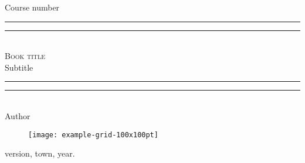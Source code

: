 \documentclass[12pt,oneside]{article}
\begin{document}
	
	\begin{titlepage}
		\hfill {}\par
		\vspace{0.25in}
		
		\begin{center}
			{Course number}\par
			\vspace{0.5in}
			\vspace*{\baselineskip}
			\rule{4.5in}{1.6pt}\vspace*{-\baselineskip}\vspace*{2pt}
			\rule{4.5in}{0.4pt}\\[\baselineskip]
			{\Huge\textsc{Book title}}\\[1\baselineskip]
			{\large Subtitle}\\[0.2\baselineskip]
			\rule{4.5in}{0.4pt}\vspace*{-\baselineskip}\vspace{3.2pt}
			\rule{4.5in}{1.6pt}\\[2\baselineskip]
			Author
			\vspace{0.5in}
			\begin{figure}[H]
				\centering
				\texttt{[image: example-grid-100x100pt]}
			\end{figure}
			\vfill
			version, town, year.
		\end{center}
	\end{titlepage}
	
\end{document}
